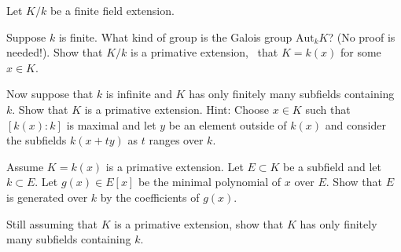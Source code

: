 Let $K/k$ be a finite field extension.
\begin{alist}
\item Suppose $k$ is finite. What kind of group is the Galois group 
$\text{Aut}_kK$? (No proof is needed!). Show that $K/k$ is a primative
extension, \ie\ that $K=k(x)$ for some $x\in K$.
\item Now suppose that $k$ is infinite and $K$ has only finitely many
subfields containing $k$. Show that $K$ is a primative extension.
Hint: Choose $x\in K$ such that $[k(x):k]$ is maximal and let $y$ be
an element outside of $k(x)$ and consider the subfields $k(x+ty)$ as
$t$ ranges over $k$.
\item Assume $K=k(x)$ is a primative extension. Let $E\subset K$ be 
a subfield and let $k\subset E$. Let $g(x)\in E[x]$ be the minimal
polynomial of $x$ over $E$. Show that $E$ is generated over $k$ by the
coefficients of $g(x)$.
\item Still assuming that $K$ is a primative extension, show that 
$K$ has only finitely many subfields containing $k$.
\end{alist}

\soln{}
